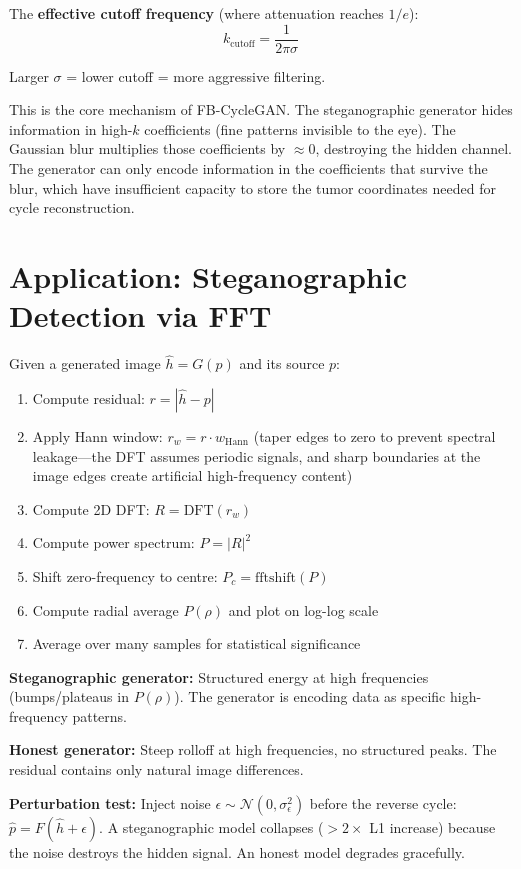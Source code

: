 \documentclass[11pt,a4paper]{article}
\theoremstyle{definition}
\begin{document}
The \textbf{effective cutoff frequency} (where attenuation reaches $1/e$):
\begin{equation}
    k_{\text{cutoff}} = \frac{1}{2\pi\sigma}
\end{equation}

Larger $\sigma$ = lower cutoff = more aggressive filtering.

\begin{application}
This is the core mechanism of FB-CycleGAN. The steganographic generator hides information in high-$k$ coefficients (fine patterns invisible to the eye). The Gaussian blur multiplies those coefficients by $\approx 0$, destroying the hidden channel. The generator can only encode information in the coefficients that survive the blur, which have insufficient capacity to store the tumor coordinates needed for cycle reconstruction.
\end{application}

\section{Application: Steganographic Detection via FFT}

Given a generated image $\hat{h} = G(p)$ and its source $p$:

\begin{enumerate}
    \item Compute residual: $r = |\hat{h} - p|$
    \item Apply Hann window: $r_w = r \cdot w_{\mathrm{Hann}}$ (taper edges to zero to prevent spectral leakage---the DFT assumes periodic signals, and sharp boundaries at the image edges create artificial high-frequency content)
    \item Compute 2D DFT: $R = \mathrm{DFT}(r_w)$
    \item Compute power spectrum: $P = |R|^2$
    \item Shift zero-frequency to centre: $P_c = \mathrm{fftshift}(P)$
    \item Compute radial average $P(\rho)$ and plot on log-log scale
    \item Average over many samples for statistical significance
\end{enumerate}

\textbf{Steganographic generator:} Structured energy at high frequencies (bumps/plateaus in $P(\rho)$). The generator is encoding data as specific high-frequency patterns.

\textbf{Honest generator:} Steep rolloff at high frequencies, no structured peaks. The residual contains only natural image differences.

\textbf{Perturbation test:} Inject noise $\epsilon \sim \mathcal{N}(0, \sigma_\epsilon^2)$ before the reverse cycle: $\hat{p} = F(\hat{h} + \epsilon)$. A steganographic model collapses ($>2\times$ L1 increase) because the noise destroys the hidden signal. An honest model degrades gracefully.
\end{document}
